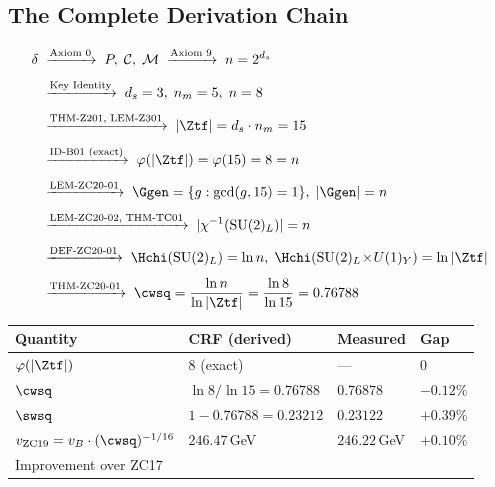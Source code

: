 \documentclass[12pt, a4paper]{article}
\begin{document}
\subsection{The Complete Derivation Chain}
\label{zc20:sec:chain}

\begin{keybox}[title={Complete Derivation Chain: $\delta$ to $\theta_W$}]
\begin{align*}
  \delta
  &\;\xrightarrow{\text{Axiom 0}}\;
  P,\;\mathcal{C},\;\mathcal{M}
  \;\xrightarrow{\text{Axiom 9}}\;
  n = 2^{d_s}\\[4pt]
  &\;\xrightarrow{\text{Key Identity}}\;
  d_s = 3,\; n_m = 5,\; n = 8\\[4pt]
  &\;\xrightarrow{\text{THM-Z201, LEM-Z301}}\;
  |\Ztf| = d_s \cdot n_m = 15\\[4pt]
  &\;\xrightarrow{\text{ID-B01 (exact)}}\;
  \varphi(|\Ztf|) = \varphi(15) = 8 = n\\[4pt]
  &\;\xrightarrow{\text{LEM-ZC20-01}}\;
  \Ggen = \{g : \gcd(g,15)=1\},\;
  |\Ggen| = n\\[4pt]
  &\;\xrightarrow{\text{LEM-ZC20-02, THM-TC01}}\;
  |\chi^{-1}(\mathrm{SU}(2)_L)| = n\\[4pt]
  &\;\xrightarrow{\text{DEF-ZC20-01}}\;
  \Hchi(\mathrm{SU}(2)_L) = \ln n,\;
  \Hchi(\mathrm{SU}(2)_L\!\times\!U(1)_Y) = \ln|\Ztf|\\[4pt]
  &\;\xrightarrow{\text{THM-ZC20-01}}\;
  \cwsq = \frac{\ln n}{\ln|\Ztf|}
  = \frac{\ln 8}{\ln 15}
  = 0.76788
\end{align*}
\end{keybox}

\begin{derivedbox}[title={Numerical Summary (Closed Chain)}]
\begin{center}
{\small
\renewcommand{\arraystretch}{1.35}
\begin{tabular}{>{\raggedright\arraybackslash}p{4.8cm}
                >{\centering\arraybackslash}p{3.0cm}
                >{\centering\arraybackslash}p{2.8cm}
                >{\centering\arraybackslash}p{1.8cm}}
\toprule
\textbf{Quantity} & \textbf{CRF (derived)} & \textbf{Measured} & \textbf{Gap} \\
\midrule
$\varphi(|\Ztf|)$ & $8$ (exact) & --- & $0$ \\
$\cwsq$ & $\ln 8/\ln 15 = 0.76788$ & $0.76878$ & $-0.12\%$ \\
$\swsq$ & $1 - 0.76788 = 0.23212$ & $0.23122$ & $+0.39\%$ \\
$v_{\rm ZC19} = v_B\cdot(\cwsq)^{-1/16}$ & $246.47$\,GeV & $246.22$\,GeV & $+0.10\%$ \\
\midrule
Improvement over ZC17 & \multicolumn{3}{c}{$475\times$ ($-47.5\% \to +0.10\%$)} \\
\bottomrule
\end{tabular}
}
\end{center}
\end{derivedbox}
\end{document}
